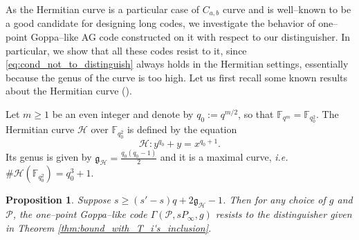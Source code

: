 \documentclass[a4paper]{article}
\newtheorem{proposition}[thm]{Proposition}
\theoremstyle{definition}
\theoremstyle{remark}
\newcommand{\calP}{\mathcal{P}}
\newcommand{\calH}{\mathcal{H}}
\newcommand{\fqm}{\mathbb{F}_{q^m}}
\newcommand{\fqo}{\mathbb{F}_{q_0^2}}
\begin{document}
As the Hermitian curve is a particular case of $C_{a,b}$ curve and is well--known to be a good candidate for designing long codes, we investigate the behavior of one--point Goppa--like AG code constructed on it with respect to our distinguisher.
In particular, we show that all these codes resist to it, since  \eqref{eq:cond_not_to_distinguish} always holds in the Hermitian settings, essentially because the genus of the curve is too high. Let us first recall some known results about the Hermitian curve (\cite{Sti09}). 

Let $m \geq 1$  be an even integer and denote by $q_0 := q^{m/2}$, so that $\fqm = \fqo$. The Hermitian curve $\calH$ over $\fqo$ is defined by the equation
$$\calH : y^{q_0}+y = x^{q_0+1}.$$
Its genus is given by $\mathfrak{g}_{\calH} = \frac{q_0(q_0-1)}{2}$ and it is a maximal curve, \emph{i.e.} $\#\calH(\fqo) = q_0^3+1$.

\begin{proposition} \label{prop:Hermitian_Goppa_like_are_secured}
    Suppose $s \geq (s'-s)q+2\mathfrak{g}_{\calH}-1$. Then for any choice of $g$ and $\calP$, the one--point Goppa--like code $\Gamma(\calP,sP_\infty,g)$ resists to the distinguisher given in Theorem \ref{thm:bound_with_T_i's_inclusion}.
\end{proposition}
\end{document}
